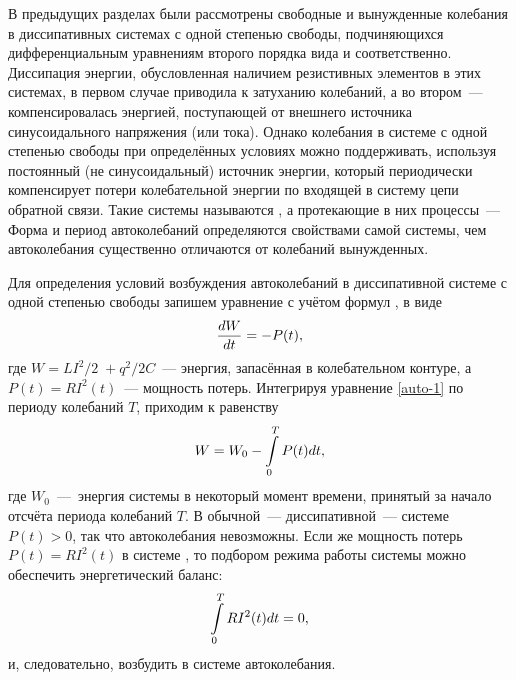 
В предыдущих разделах были рассмотрены свободные и вынужденные колебания в
диссипативных системах с одной степенью свободы, подчиняющихся дифференциальным
уравнениям второго порядка вида  и 
соответственно. Диссипация энергии, обусловленная наличием резистивных элементов
в этих системах, в первом случае приводила к затуханию колебаний, а во
втором~--- компенсировалась энергией, поступающей от
внешнего источника синусоидального напряжения (или тока). Однако колебания в
системе с одной степенью свободы при определённых условиях можно поддерживать,
используя постоянный (не синусоидальный) источник энергии, который периодически
компенсирует потери колебательной энергии по входящей в систему цепи обратной
связи. Такие системы называются , а протекающие в
них процессы~---  Форма и период автоколебаний
определяются свойствами самой системы, чем автоколебания существенно отличаются
от колебаний вынужденных.

Для определения условий возбуждения автоколебаний в диссипативной системе с
одной степенью свободы запишем уравнение  с учётом формул
,  в виде
\begin{equation}
	\eqmark{auto-1}
	\frac{dW}{dt}=-P(t),
\end{equation}
где $W={LI^2}/{2}\;+{q^2}/{2C}$~--- энергия, запасённая в колебательном контуре,
а $P(t)=R{{I}^{2}}(t)$~--- мощность потерь. Интегрируя уравнение \eqref{auto-1}
по периоду колебаний $T$, приходим к равенству
\begin{equation}
	\eqmark{auto-2}
	W=W_0-\int\limits_{0}^{T}P(t)dt,
\end{equation}
где $W_0$~---~энергия системы в некоторый момент времени, принятый за начало
отсчёта периода колебаний $T$. В обычной~--- диссипативной~--- системе $P(t)>0$,
так что автоколебания невозможны. Если же мощность потерь $P(t)=R{{I}^{2}}(t)$ в
системе , то подбором режима работы системы можно
обеспечить энергетический баланс:
\begin{equation}
	\eqmark{auto-3}
	\int\limits_{0}^{T}{R{{I}^{2}}(t)dt}=0,
\end{equation}
и, следовательно, возбудить в системе автоколебания.

